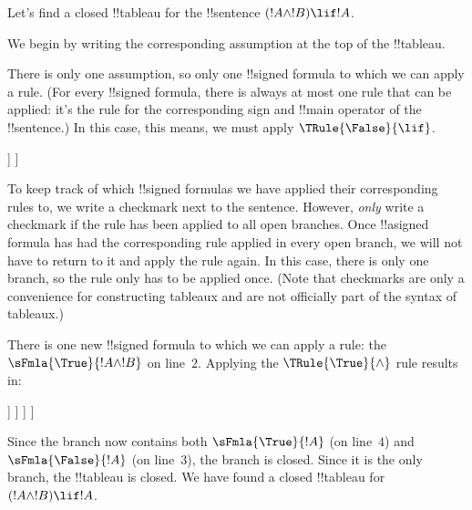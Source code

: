 

\begin{ex}
Let's find a closed !!{tableau} for the !!{sentence} $(!A \land !B) \lif !A$.

We begin by writing the corresponding assumption at the top of the
!!{tableau}.
\begin{oltableau}
  [\sFmla{\False}{(\formula{A} \land \formula{B}) \lif \formula{A}},
    just = \TAss]
\end{oltableau}

There is only one assumption, so only one !!{signed formula} to which
we can apply a rule. (For every !!{signed formula}, there is always at
most one rule that can be applied: it's the rule for the corresponding
sign and !!{main operator} of the !!{sentence}.) In this case, this
means, we must apply $\TRule{\False}{\lif}$.
\begin{oltableau}
  [\sFmla{\False}{(\formula{A} \land \formula{B}) \lif \formula{A}},
    checked, just = \TAss
    [\sFmla{\True}{\formula{A} \land \formula{B}},
      just={\TRule{\False}{\lif}[1]}
      [\sFmla{\False}{\formula{A}}, just={\TRule{\False}{\lif}[1]}]
    ]
  ]
\end{oltableau}
To keep track of which !!{signed formula}s we have applied their
corresponding rules to, we write a checkmark next to the
sentence. However, \emph{only} write a checkmark if the rule has been
applied to all open branches. Once !!a{signed formula} has had the
corresponding rule applied in every open branch, we will not have to
return to it and apply the rule again. In this case, there is only one
branch, so the rule only has to be applied once. (Note that checkmarks
are only a convenience for constructing tableaux and are not
officially part of the syntax of tableaux.)

There is one new !!{signed formula} to which we can apply a rule: the
$\sFmla{\True}{!A \land !B}$ on line~$2$. Applying the
$\TRule{\True}{\land}$ rule results in:
\begin{oltableau}
  [\sFmla{\False}{(\formula{A} \land \formula{B}) \lif \formula{A}},
    checked, just = \TAss
    [\sFmla{\True}{\formula{A} \land \formula{B}},
      just={\TRule{\False}{\lif}[1]}, checked
      [\sFmla{\False}{\formula{A}}, just={\TRule{\False}{\lif}[1]}
        [\sFmla{\True}{\formula{A}}, just={\TRule{\True}{\land}[2]}
          [\sFmla{\True}{\formula{B}}, just={\TRule{\True}{\land}[2]}, close
          ]
        ]
      ]
    ]
  ]
\end{oltableau}
Since the branch now contains both $\sFmla{\True}{!A}$ (on line~$4$)
and $\sFmla{\False}{!A}$ (on line~$3$), the branch is closed. Since it
is the only branch, the !!{tableau} is closed. We have found
a closed !!{tableau} for~$(!A \land !B) \lif !A$.
\end{ex}

